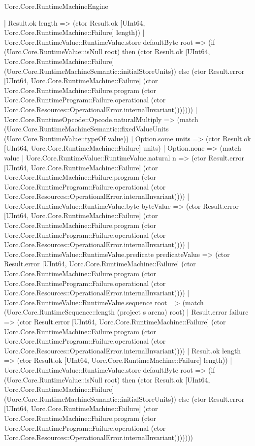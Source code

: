 \begin{lexlean}{Uorc.Core.RuntimeMachineEngine}
\begin{semanticmodule}
{                | Result.ok length => (ctor Result.ok [UInt64, Uorc.Core.RuntimeMachine::Failure] length))
              | Uorc.Core.RuntimeValue::RuntimeValue.store defaultByte root => (if (Uorc.Core.RuntimeValue::isNull root) then (ctor Result.ok [UInt64, Uorc.Core.RuntimeMachine::Failure] (Uorc.Core.RuntimeMachineSemantic::initialStoreUnits)) else (ctor Result.error [UInt64, Uorc.Core.RuntimeMachine::Failure] (ctor Uorc.Core.RuntimeMachine::Failure.program (ctor Uorc.Core.RuntimeProgram::Failure.operational (ctor Uorc.Core.Resources::OperationalError.internalInvariant)))))))
          | Uorc.Core.RuntimeOpcode::Opcode.naturalMultiply => (match (Uorc.Core.RuntimeMachineSemantic::fixedValueUnits (Uorc.Core.RuntimeValue::typeOf value))
            | Option.some units => (ctor Result.ok [UInt64, Uorc.Core.RuntimeMachine::Failure] units)
            | Option.none => (match value
              | Uorc.Core.RuntimeValue::RuntimeValue.natural n => (ctor Result.error [UInt64, Uorc.Core.RuntimeMachine::Failure] (ctor Uorc.Core.RuntimeMachine::Failure.program (ctor Uorc.Core.RuntimeProgram::Failure.operational (ctor Uorc.Core.Resources::OperationalError.internalInvariant))))
              | Uorc.Core.RuntimeValue::RuntimeValue.byte byteValue => (ctor Result.error [UInt64, Uorc.Core.RuntimeMachine::Failure] (ctor Uorc.Core.RuntimeMachine::Failure.program (ctor Uorc.Core.RuntimeProgram::Failure.operational (ctor Uorc.Core.Resources::OperationalError.internalInvariant))))
              | Uorc.Core.RuntimeValue::RuntimeValue.predicate predicateValue => (ctor Result.error [UInt64, Uorc.Core.RuntimeMachine::Failure] (ctor Uorc.Core.RuntimeMachine::Failure.program (ctor Uorc.Core.RuntimeProgram::Failure.operational (ctor Uorc.Core.Resources::OperationalError.internalInvariant))))
              | Uorc.Core.RuntimeValue::RuntimeValue.sequence root => (match (Uorc.Core.RuntimeSequence::length (project s arena) root)
                | Result.error failure => (ctor Result.error [UInt64, Uorc.Core.RuntimeMachine::Failure] (ctor Uorc.Core.RuntimeMachine::Failure.program (ctor Uorc.Core.RuntimeProgram::Failure.operational (ctor Uorc.Core.Resources::OperationalError.internalInvariant))))
                | Result.ok length => (ctor Result.ok [UInt64, Uorc.Core.RuntimeMachine::Failure] length))
              | Uorc.Core.RuntimeValue::RuntimeValue.store defaultByte root => (if (Uorc.Core.RuntimeValue::isNull root) then (ctor Result.ok [UInt64, Uorc.Core.RuntimeMachine::Failure] (Uorc.Core.RuntimeMachineSemantic::initialStoreUnits)) else (ctor Result.error [UInt64, Uorc.Core.RuntimeMachine::Failure] (ctor Uorc.Core.RuntimeMachine::Failure.program (ctor Uorc.Core.RuntimeProgram::Failure.operational (ctor Uorc.Core.Resources::OperationalError.internalInvariant)))))))
}
\end{semanticmodule}
\end{lexlean}
